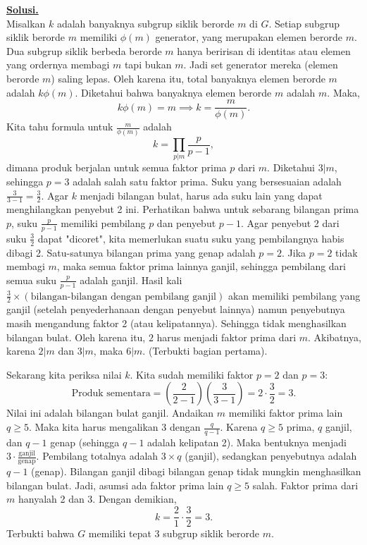 \documentclass[12pt,twoside]{article}
\newenvironment{solution}
{
	\par\noindent\textbf{\underline{Solusi.}}\\
}
{
	\par
}
\begin{document}
\begin{enumerate}
        \begin{solution}
          Misalkan $k$ adalah banyaknya subgrup siklik berorde $m$ di $G$.
          Setiap subgrup siklik berorde $m$ memiliki $\phi(m)$ generator, yang merupakan elemen berorde $m$.
          Dua subgrup siklik berbeda berorde $m$ hanya beririsan di identitas atau elemen yang ordernya membagi $m$ tapi bukan $m$. Jadi set generator mereka (elemen berorde $m$) saling lepas.
          Oleh karena itu, total banyaknya elemen berorde $m$ adalah $k \phi(m)$.
          Diketahui bahwa banyaknya elemen berorde $m$ adalah $m$.
          Maka,
          \[ k \phi(m) = m \implies k = \frac{m}{\phi(m)}. \]
          Kita tahu formula untuk $\frac{m}{\phi(m)}$ adalah
          \[ k = \prod_{p|m} \frac{p}{p-1}, \]
          dimana produk berjalan untuk semua faktor prima $p$ dari $m$.
          Diketahui $3|m$, sehingga $p=3$ adalah salah satu faktor prima. Suku yang bersesuaian adalah $\frac{3}{3-1} = \frac{3}{2}$.
          Agar $k$ menjadi bilangan bulat, harus ada suku lain yang dapat menghilangkan penyebut 2 ini.
          Perhatikan bahwa untuk sebarang bilangan prima $p$, suku $\frac{p}{p-1}$ memiliki pembilang $p$ dan penyebut $p-1$.
          Agar penyebut 2 dari suku $\frac{3}{2}$ dapat "dicoret", kita memerlukan suatu suku yang pembilangnya habis dibagi 2.
          Satu-satunya bilangan prima yang genap adalah $p=2$.
          Jika $p=2$ tidak membagi $m$, maka semua faktor prima lainnya ganjil, sehingga pembilang dari semua suku $\frac{p}{p-1}$ adalah ganjil.
          Hasil kali $\frac{3}{2} \times (\text{bilangan-bilangan dengan pembilang ganjil})$ akan memiliki pembilang yang ganjil (setelah penyederhanaan dengan penyebut lainnya) namun penyebutnya masih mengandung faktor 2 (atau kelipatannya). Sehingga tidak menghasilkan bilangan bulat.
          Oleh karena itu, $2$ harus menjadi faktor prima dari $m$.
          Akibatnya, karena $2|m$ dan $3|m$, maka $6|m$. (Terbukti bagian pertama).

          Sekarang kita periksa nilai $k$. Kita sudah memiliki faktor $p=2$ dan $p=3$:
          \[ \text{Produk sementara} = \left(\frac{2}{2-1}\right) \left(\frac{3}{3-1}\right) = 2 \cdot \frac{3}{2} = 3. \]
          Nilai ini adalah bilangan bulat ganjil.
          Andaikan $m$ memiliki faktor prima lain $q \ge 5$. Maka kita harus mengalikan 3 dengan $\frac{q}{q-1}$.
          Karena $q \ge 5$ prima, $q$ ganjil, dan $q-1$ genap (sehingga $q-1$ adalah kelipatan 2).
          Maka bentuknya menjadi $3 \cdot \frac{\text{ganjil}}{\text{genap}}$.
          Pembilang totalnya adalah $3 \times q$ (ganjil), sedangkan penyebutnya adalah $q-1$ (genap).
          Bilangan ganjil dibagi bilangan genap tidak mungkin menghasilkan bilangan bulat.
          Jadi, asumsi ada faktor prima lain $q \ge 5$ salah.
          Faktor prima dari $m$ hanyalah 2 dan 3.
          Dengan demikian,
          \[ k = \frac{2}{1} \cdot \frac{3}{2} = 3. \]
          Terbukti bahwa $G$ memiliki tepat 3 subgrup siklik berorde $m$.
        \end{solution}
\end{enumerate}
\pagebreak
\end{document}
